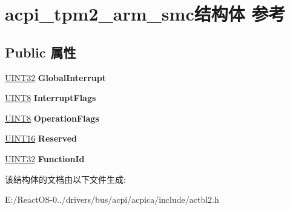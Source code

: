 \hypertarget{structacpi__tpm2__arm__smc}{}\section{acpi\+\_\+tpm2\+\_\+arm\+\_\+smc结构体 参考}
\label{structacpi__tpm2__arm__smc}
\subsection*{Public 属性}
\begin{DoxyCompactItemize}
\item 
\mbox{\label{structacpi__tpm2__arm__smc_a273f4643d49eae891a4916728de262bc}} 
\hyperlink{_processor_bind_8h_ae1e6edbbc26d6fbc71a90190d0266018}{U\+I\+N\+T32} {\bfseries Global\+Interrupt}
\item 
\mbox{\label{structacpi__tpm2__arm__smc_aa74a212102a0980a877097d02b880e99}} 
\hyperlink{_processor_bind_8h_ab27e9918b538ce9d8ca692479b375b6a}{U\+I\+N\+T8} {\bfseries Interrupt\+Flags}
\item 
\mbox{\label{structacpi__tpm2__arm__smc_a247dadc17d26760d27f0629bfbc34765}} 
\hyperlink{_processor_bind_8h_ab27e9918b538ce9d8ca692479b375b6a}{U\+I\+N\+T8} {\bfseries Operation\+Flags}
\item 
\mbox{\label{structacpi__tpm2__arm__smc_a6166daf0887fcf5d8f61c1ab7b5c5848}} 
\hyperlink{_processor_bind_8h_a09f1a1fb2293e33483cc8d44aefb1eb1}{U\+I\+N\+T16} {\bfseries Reserved}
\item 
\mbox{\label{structacpi__tpm2__arm__smc_aaa85c02a8618c2aacab602f62c4b183c}} 
\hyperlink{_processor_bind_8h_ae1e6edbbc26d6fbc71a90190d0266018}{U\+I\+N\+T32} {\bfseries Function\+Id}
\end{DoxyCompactItemize}


该结构体的文档由以下文件生成\+:\begin{DoxyCompactItemize}
\item 
E\+:/\+React\+O\+S-\/0../drivers/bus/acpi/acpica/include/actbl2.\+h\end{DoxyCompactItemize}
